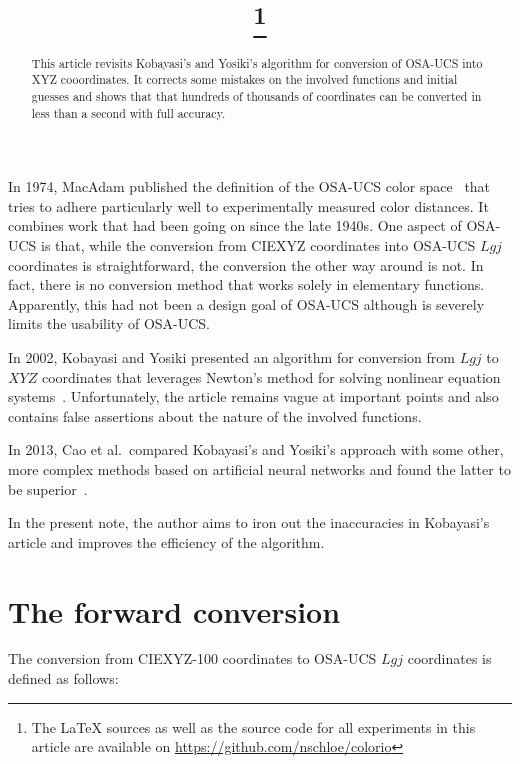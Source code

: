 \documentclass{scrartcl}
\title{\mytitle\footnote{The LaTeX sources as well as the source code for all
experiments in this article are available on \url{https://github.com/nschloe/colorio}}}
\author{\myauthor}
\theoremstyle{named}
\begin{document}
\maketitle

\begin{abstract}
This article revisits Kobayasi's and Yosiki's algorithm for conversion of OSA-UCS into
  XYZ cooordinates. It corrects some mistakes on the involved functions and initial
  guesses and shows that that hundreds of thousands of coordinates can be converted in
  less than a second with full accuracy.
\end{abstract}

In 1974, MacAdam published the definition of the OSA-UCS color space~\cite{macadam} that
tries to adhere particularly well to experimentally measured color distances. It
combines work that had been going on since the late 1940s. One aspect of OSA-UCS is
that, while the conversion from CIEXYZ coordinates into OSA-UCS $Lgj$ coordinates is
straightforward, the conversion the other way around is not. In fact, there is no
conversion method that works solely in elementary functions. Apparently, this had not
been a design goal of OSA-UCS although is severely limits the usability of OSA-UCS.

In 2002, Kobayasi and Yosiki presented an algorithm for conversion from $Lgj$ to $XYZ$
coordinates that leverages Newton's method for solving nonlinear equation
systems~\cite{kobayasi}. Unfortunately, the article remains vague at important points
and also contains false assertions about the nature of the involved functions.

In 2013, Cao et al.\ compared Kobayasi's and Yosiki's approach with some other, more
complex methods based on artificial neural networks and found the latter to be
superior~\cite{cao}.

In the present note, the author aims to iron out the inaccuracies in Kobayasi's article
and improves the efficiency of the algorithm.

\section{The forward conversion}

The conversion from CIEXYZ-100 coordinates to OSA-UCS $Lgj$ coordinates is defined as
follows:
\end{document}
